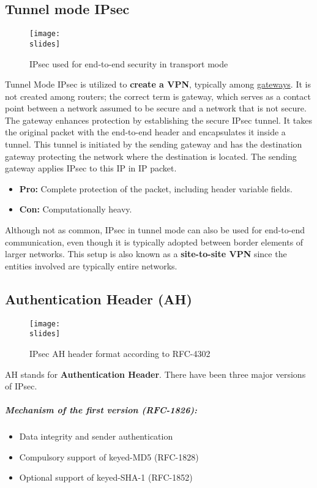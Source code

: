 \subsection{Tunnel mode IPsec}
\begin{figure}[h]
    \centering
    \texttt{[image: \\slides]}
    \caption{IPsec used for end-to-end security in transport mode}
\end{figure}

Tunnel Mode IPsec is utilized to \textbf{create a VPN}, typically among \underline{gateways}. It is not created among routers; the correct term is gateway, which serves as a contact point between a network assumed to be secure and a network that is not secure. The gateway enhances protection by establishing the secure IPsec tunnel. It takes the original packet with the end-to-end header and encapsulates it inside a tunnel. This tunnel is initiated by the sending gateway and has the destination gateway protecting the network where the destination is located. The sending gateway applies IPsec to this IP in IP packet.

\begin{itemize}
    \item \textbf{Pro:} Complete protection of the packet, including header variable fields.
    \item \textbf{Con:} Computationally heavy.
\end{itemize}

Although not as common, IPsec in tunnel mode can also be used for end-to-end communication, even though it is typically adopted between border elements of larger networks. This setup is also known as a \textbf{site-to-site VPN} since the entities involved are typically entire networks.


\subsection{Authentication Header (AH)}
\begin{figure}[h]
    \centering
    \texttt{[image: \\slides]}
    \caption{IPsec AH header format according to RFC-4302}
\end{figure}

AH stands for \textbf{Authentication Header}. There have been three major versions of IPsec.

\subparagraph{Mechanism of the \textbf{first version} (RFC-1826):}
\begin{itemize}
    \item Data integrity and sender authentication
    \item Compulsory support of keyed-MD5 (RFC-1828)
    \item Optional support of keyed-SHA-1 (RFC-1852)
\end{itemize}

